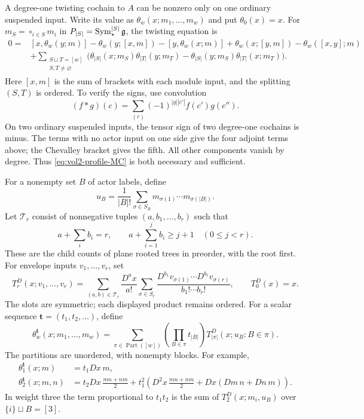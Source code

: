 A degree-one twisting cochain to $A$ can be nonzero only on one
ordinary suspended input. Write its value as
$\theta_w(x;m_1,\ldots,m_w)$ and put $\theta_0(x)=x$.
For $m_S=\mathop{\circ}_{i\in S}m_i$ in
$P_{|S|}=\operatorname{Sym}_{\star}^{|S|}\mathfrak g$, the twisting equation is
\begin{equation}\label{eq:vol2-profile-MC}
\begin{aligned}
0={}&[x,\theta_w(y;m)]-\theta_w(y;[x,m])
       -[y,\theta_w(x;m)]+\theta_w(x;[y,m])
       -\theta_w([x,y];m)\\
 &+\sum_{\substack{S\sqcup T=[w]\\S,T\ne\varnothing}}
 \bigl(\theta_{|S|}(x;m_S)\theta_{|T|}(y;m_T)
       -\theta_{|S|}(y;m_S)\theta_{|T|}(x;m_T)\bigr).
\end{aligned}
\end{equation}
Here $[x,m]$ is the sum of brackets with each module input, and the
splitting $(S,T)$ is ordered. To verify the signs, use convolution
\[
 (f*g)(c)=\sum_{(c)}(-1)^{|g||c'|}f(c')g(c'').
\]
On two ordinary suspended inputs, the tensor sign of two degree-one
cochains is minus. The terms with no actor input on one side give
the four adjoint terms above; the Chevalley bracket gives the fifth.
All other components vanish by degree. Thus
\eqref{eq:vol2-profile-MC} is both necessary and sufficient.

For a nonempty set $B$ of actor labels, define
\[
 u_B=\frac1{|B|!}\sum_{\sigma\in S_B}
                   m_{\sigma(1)}\cdots m_{\sigma(|B|)}.
\]
Let $\mathcal T_r$ consist of nonnegative tuples
$(a,b_1,\ldots,b_r)$ such that
\[
 a+\sum_i b_i=r,\qquad
 a+\sum_{i=1}^j b_i\geq j+1\quad(0\leq j<r).
\]
These are the child counts of plane rooted trees in preorder, with
the root first. For envelope inputs $v_1,\ldots,v_r$, set
\begin{equation}\label{eq:vol2-profile-trees}
 T_r^D(x;v_1,\ldots,v_r)=
 \sum_{(a,b)\in\mathcal T_r}\frac{D^ax}{a!}
 \sum_{\sigma\in S_r}
 \frac{D^{b_1}v_{\sigma(1)}\cdots D^{b_r}v_{\sigma(r)}}
      {b_1!\cdots b_r!},\qquad T_0^D(x)=x.
\end{equation}
The slots are symmetric; each displayed product remains ordered.
For a scalar sequence $\mathbf t=(t_1,t_2,\ldots)$, define
\begin{equation}\label{eq:vol2-profile-partitions}
 \theta_w^{\mathbf t}(x;m_1,\ldots,m_w)=
 \sum_{\pi\in\operatorname{Part}([w])}
       \left(\prod_{B\in\pi}t_{|B|}\right)
       T_{|\pi|}^D(x;u_B:B\in\pi).
\end{equation}
The partitions are unordered, with nonempty blocks. For example,
\begin{align*}
 \theta_1^{\mathbf t}(x;m)&=t_1Dx\,m,\\
 \theta_2^{\mathbf t}(x;m,n)
 &=t_2Dx\,\frac{mn+nm}{2}
   +t_1^2\left(D^2x\,\frac{mn+nm}{2}
                   +Dx(Dm\,n+Dn\,m)\right).
\end{align*}
In weight three the term proportional to $t_1t_2$ is the sum of
$T_2^D(x;m_i,u_B)$ over $\{i\}\sqcup B=[3]$.

